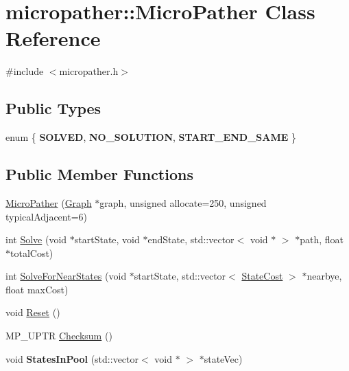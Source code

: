 \hypertarget{classmicropather_1_1_micro_pather}{\section{micropather\-:\-:Micro\-Pather Class Reference}
\label{classmicropather_1_1_micro_pather}
}


{\ttfamily \#include $<$micropather.\-h$>$}

\subsection*{Public Types}
\begin{DoxyCompactItemize}
\item 
enum \{ {\bfseries S\-O\-L\-V\-E\-D}, 
{\bfseries N\-O\-\_\-\-S\-O\-L\-U\-T\-I\-O\-N}, 
{\bfseries S\-T\-A\-R\-T\-\_\-\-E\-N\-D\-\_\-\-S\-A\-M\-E}
 \}
\end{DoxyCompactItemize}
\subsection*{Public Member Functions}
\begin{DoxyCompactItemize}
\item 
\hyperlink{classmicropather_1_1_micro_pather_a560b850638770e89ee998335d8b4c162}{Micro\-Pather} (\hyperlink{classmicropather_1_1_graph}{Graph} $\ast$graph, unsigned allocate=250, unsigned typical\-Adjacent=6)
\item 
int \hyperlink{classmicropather_1_1_micro_pather_af81b5dad8f89610026b8f0762d981730}{Solve} (void $\ast$start\-State, void $\ast$end\-State, std\-::vector$<$ void $\ast$ $>$ $\ast$path, float $\ast$total\-Cost)
\item 
int \hyperlink{classmicropather_1_1_micro_pather_ae91b62a7e416e34e6e23dd5db257cdbd}{Solve\-For\-Near\-States} (void $\ast$start\-State, std\-::vector$<$ \hyperlink{structmicropather_1_1_state_cost}{State\-Cost} $>$ $\ast$nearbye, float max\-Cost)
\item 
void \hyperlink{classmicropather_1_1_micro_pather_aa830a9fa99403c14c6791f513a8e2342}{Reset} ()
\item 
M\-P\-\_\-\-U\-P\-T\-R \hyperlink{classmicropather_1_1_micro_pather_a7b6bc881e8c720c45785b4046ed18c04}{Checksum} ()
\item 
\hypertarget{classmicropather_1_1_micro_pather_a29e293c8313984561813014220243619}{void {\bfseries States\-In\-Pool} (std\-::vector$<$ void $\ast$ $>$ $\ast$state\-Vec)}\label{classmicropather_1_1_micro_pather_a29e293c8313984561813014220243619}

\end{DoxyCompactItemize}
